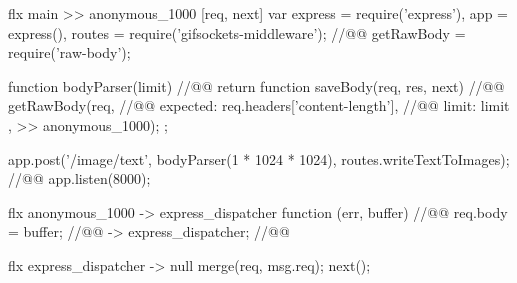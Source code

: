 




\begin{code}[flx, caption={Simplified modification on the compiled result},label={lst:mflx-gifsocket}]
flx main
>> anonymous_1000 [req, next]
  var express = require('express'),
      app = express(),
      routes = require('gifsockets-middleware'); //@\label{lst:flx-gifsocket:gif-mw}@
      getRawBody = require('raw-body');

  function bodyParser(limit) { //@\label{lst:flx-gifsocket:bodyParser}@
    return function saveBody(req, res, next) { //@\label{lst:flx-gifsocket:saveBody}@
      getRawBody(req, { //@\label{lst:flx-gifsocket:getRawBody}@
        expected: req.headers['content-length'], //@\label{lst:flx-gifsocket:req.headers}@
        limit: limit
      }, >> anonymous_1000);
    };
  }

  app.post('/image/text', bodyParser(1 * 1024 * 1024), routes.writeTextToImages); //@\label{lst:flx-gifsocket:app.post}@
  app.listen(8000);

flx anonymous_1000
-> express_dispatcher
  function (err, buffer) { //@\label{lst:flx-gifsocket:callback}@
    req.body = buffer; //@\label{lst:flx-gifsocket:buffer}@
    -> express_dispatcher; //@\label{lst:flx-gifsocket:next}@
  }

flx express_dispatcher
-> null
  merge(req, msg.req);
  next();
\end{code}

